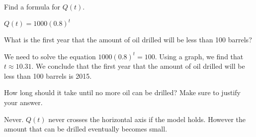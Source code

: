 \begin{problem}[Resources]
\begin{subproblem}
\end{subproblem}
\begin{subproblem}
	Find a formula for $Q(t)$.
	\begin{shortsolution}
		$Q(t)=1000(0.8)^t$
	\end{shortsolution}
\end{subproblem}
\begin{subproblem}
	What is the first year that the amount of oil drilled will be less than 100 barrels?
	\begin{shortsolution}
		We need to solve the equation $1000(0.8)^t=100$. Using a graph, we find that $t\approx 10.31$. We conclude that
		the first year that the amount of oil drilled will be less than 100 barrels is 2015.
	\end{shortsolution}
\end{subproblem}
\begin{subproblem}
	How long should it take until no more oil can be drilled?  Make sure to justify your answer.
	\begin{shortsolution}
		Never. $Q(t)$ never crosses the horizontal axis if the model holds.  However the amount that can be drilled 	eventually becomes small.
	\end{shortsolution}
\end{subproblem}
\end{problem}
